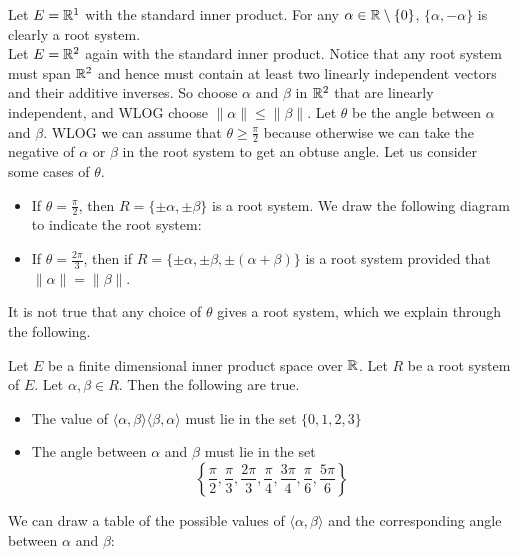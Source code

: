 \documentclass[a4paper]{article}
\begin{document}
Let $E=\mathbb{R}^1$ with the standard inner product. For any $\alpha\in\mathbb{R}\setminus\{0\}$, $\{\alpha,-\alpha\}$ is clearly a root system. \\

Let $E=\mathbb{R}^2$ again with the standard inner product. Notice that any root system must span $\mathbb{R}^2$ and hence must contain at least two linearly independent vectors and their additive inverses. So choose $\alpha$ and $\beta$ in $\mathbb{R}^2$ that are linearly independent, and WLOG choose $\|\alpha\|\leq\|\beta\|$. Let $\theta$ be the angle between $\alpha$ and $\beta$. WLOG we can assume that $\theta\geq\frac{\pi}{2}$ because otherwise we can take the negative of $\alpha$ or $\beta$ in the root system to get an obtuse angle. Let us consider some cases of $\theta$. 

\begin{itemize}
\item If $\theta=\frac{\pi}{2}$, then $R=\{\pm\alpha,\pm\beta\}$ is a root system. We draw the following diagram to indicate the root system: 
\item If $\theta=\frac{2\pi}{3}$, then if $R=\{\pm\alpha,\pm\beta,\pm(\alpha+\beta)\}$ is a root system provided that $\|\alpha\|=\|\beta\|$. 
\end{itemize}

It is not true that any choice of $\theta$ gives a root system, which we explain through the following. 

\begin{lmm}{}{} Let $E$ be a finite dimensional inner product space over $\mathbb{R}$. Let $R$ be a root system of $E$. Let $\alpha,\beta\in R$. Then the following are true. 
\begin{itemize}
\item The value of $\langle\alpha,\beta\rangle\langle\beta,\alpha\rangle$ must lie in the set $\{0,1,2,3\}$
\item The angle between $\alpha$ and $\beta$ must lie in the set $$\left\{\frac{\pi}{2},\frac{\pi}{3},\frac{2\pi}{3},\frac{\pi}{4},\frac{3\pi}{4},\frac{\pi}{6},\frac{5\pi}{6}\right\}$$
\end{itemize}
\end{lmm}

We can draw a table of the possible values of $\langle\alpha,\beta\rangle$ and the corresponding angle between $\alpha$ and $\beta$: 
\end{document}
